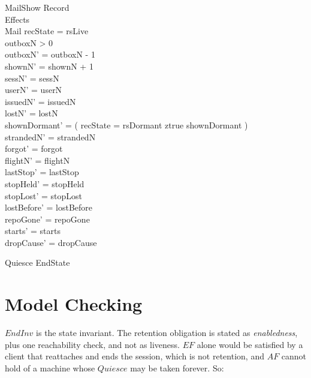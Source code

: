 \documentclass[a4paper,10pt,fleqn]{article}
\begin{document}
\begin{schema}{MailShow}
  \Xi Record \\
  \Xi Effects \\
  \Delta Mail
  \where
  recState = rsLive \\
  outboxN > 0 \\
  outboxN' = outboxN - 1 \\
  shownN' = shownN + 1 \\
  sessN' = sessN \\
  userN' = userN \\
  issuedN' = issuedN \\
  lostN' = lostN \\
  shownDormant' = ( \IF recState = rsDormant \THEN ztrue \ELSE shownDormant ) \\
  strandedN' = strandedN \\
  forgot' = forgot \\
  flightN' = flightN \\
  lastStop' = lastStop \\
  stopHeld' = stopHeld \\
  stopLost' = stopLost \\
  lostBefore' = lostBefore \\
  repoGone' = repoGone \\
  starts' = starts \\
  dropCause' = dropCause
\end{schema}

\begin{schema}{Quiesce}
  \Xi EndState
\end{schema}

\section{Model Checking}

$EndInv$ is the state invariant.  The retention obligation is stated as
\emph{enabledness}, plus one reachability check, and not as liveness.  $EF$
alone would be satisfied by a client that reattaches and ends the session, which
is not retention, and $AF$ cannot hold of a machine whose $Quiesce$ may be taken
forever.  So:
\end{document}

